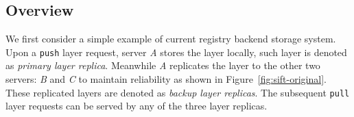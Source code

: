 \subsection{Overview}
\label{sec:overview}


%

We first consider 
a simple example of current registry backend storage system.
Upon a \texttt{push} layer request,
server \emph{A} stores the layer locally, such layer is denoted as \emph{primary layer replica}.
Meanwhile \emph{A} replicates the layer to the other two servers: 
\emph{B} and \emph{C} to maintain reliability as shown in Figure~\ref{fig:sift-original}. 
These replicated layers are denoted as \emph{backup layer replicas}.
The subsequent \texttt{pull} layer requests can be served by 
any of the three layer replicas.%

